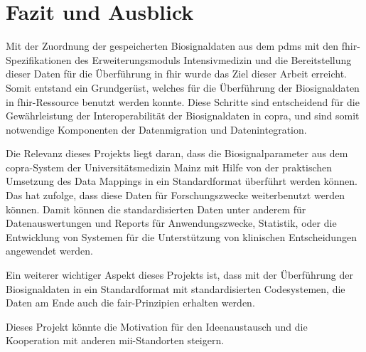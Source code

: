 \chapter{Fazit und Ausblick} \label{ch:conclussion}

Mit der Zuordnung der gespeicherten Biosignaldaten aus dem \ac{pdms} mit den \ac{fhir}-Spezifikationen des Erweiterungsmoduls \glqq Intensivmedizin\grqq{} und die Bereitstellung dieser Daten für die Überführung in \ac{fhir} wurde das Ziel dieser Arbeit erreicht. Somit entstand ein Grundgerüst, welches für die Überführung der Biosignaldaten in \ac{fhir}-Ressource benutzt werden konnte. Diese Schritte sind entscheidend für die Gewährleistung der Interoperabilität der Biosignaldaten in \ac{copra}, und sind somit notwendige Komponenten der Datenmigration und Datenintegration.

Die Relevanz dieses Projekts liegt daran, dass die Biosignalparameter aus dem \ac{copra}-System der Universitätsmedizin Mainz mit Hilfe von der praktischen Umsetzung des Data Mappings in ein Standardformat überführt werden können. Das hat zufolge, dass diese Daten für Forschungszwecke weiterbenutzt werden können. Damit können die standardisierten Daten unter anderem für Datenauswertungen und Reports für Anwendungszwecke, Statistik, oder die Entwicklung von Systemen für die Unterstützung von klinischen Entscheidungen angewendet werden.

Ein weiterer wichtiger Aspekt dieses Projekts ist, dass mit der Überführung der Biosignaldaten in ein Standardformat mit standardisierten Codesystemen, die Daten am Ende auch die \ac{fair}-Prinzipien erhalten werden.

Dieses Projekt könnte die Motivation für den Ideenaustausch und die Kooperation mit anderen \ac{mii}-Standorten steigern.
